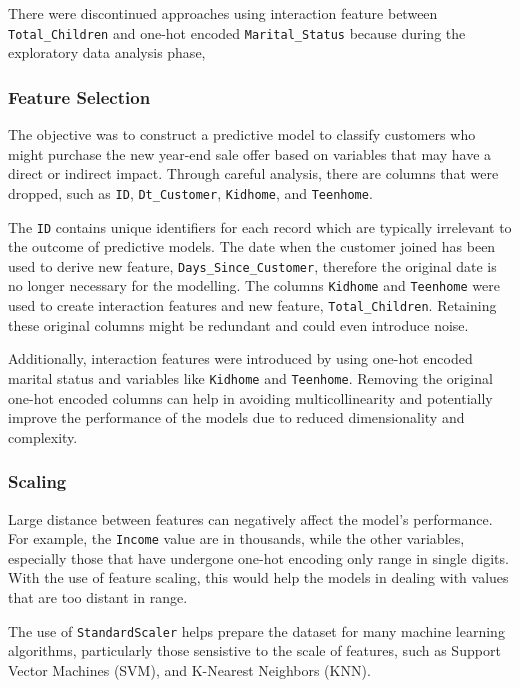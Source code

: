 There were discontinued approaches using interaction feature between \texttt{Total\_Children} and one-hot encoded \texttt{Marital\_Status} because during the exploratory data analysis phase,

\subsubsection{Feature Selection}

The objective was to construct a predictive model to classify customers who might purchase the new year-end sale offer based on variables that may have a direct or indirect impact. Through careful analysis, there are columns that were dropped, such as \texttt{ID}, \texttt{Dt\_Customer}, \texttt{Kidhome}, and \texttt{Teenhome}. 

The \texttt{ID} contains unique identifiers for each record which are typically irrelevant to the outcome of predictive models. The date when the customer joined has been used to derive new feature, \texttt{Days\_Since\_Customer}, therefore the original date is no longer necessary for the modelling. The columns \texttt{Kidhome} and \texttt{Teenhome} were used to create interaction features and new feature, \texttt{Total\_Children}. Retaining these original columns might be redundant and could even introduce noise.

Additionally, interaction features were introduced by  using one-hot encoded marital status and variables like \texttt{Kidhome} and \texttt{Teenhome}. Removing the original one-hot encoded columns can help in avoiding multicollinearity and potentially improve the performance of the models due to reduced dimensionality and complexity.

\subsubsection{Scaling}

Large distance between features can negatively affect the model's performance. For example, the \texttt{Income} value are in thousands, while the other variables, especially those that have undergone one-hot encoding only range in single digits. With the use of feature scaling, this would help the models in dealing with values that are too distant in range.

The use of \texttt{StandardScaler} helps prepare the dataset for many machine learning algorithms, particularly those sensistive to the scale of features, such as Support Vector Machines (SVM), and K-Nearest Neighbors (KNN). 

